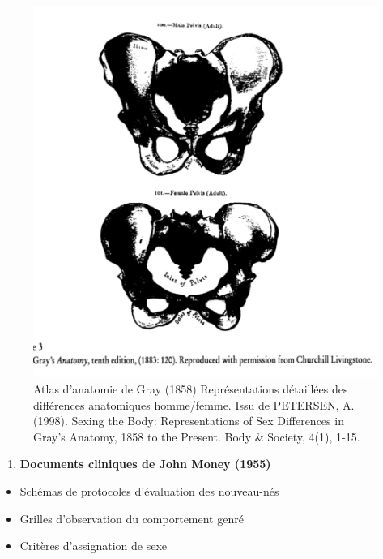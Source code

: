 \documentclass[
  letterpaper,
  DIV=11,
  numbers=noendperiod]{scrreprt}
\providecommand{\tightlist}{%
  \setlength{\itemsep}{0pt}\setlength{\parskip}{0pt}}\usepackage{longtable,booktabs,array}
\begin{document}
\begin{figure}[H]

{\centering \includegraphics{images/clipboard-1285558360.png}

}

\caption{Atlas d'anatomie de Gray (1858) Représentations détaillées des
différences anatomiques homme/femme. Issu de PETERSEN, A. (1998). Sexing
the Body: Representations of Sex Differences in Gray's Anatomy, 1858 to
the Present. Body \& Society, 4(1), 1-15.}

\end{figure}%

\begin{enumerate}
\def\labelenumi{\arabic{enumi}.}
\setcounter{enumi}{2}
\tightlist
\item
  \textbf{Documents cliniques de John Money (1955)}
\end{enumerate}

\begin{itemize}
\tightlist
\item
  Schémas de protocoles d'évaluation des nouveau-nés
\item
  Grilles d'observation du comportement genré
\item
  Critères d'assignation de sexe
\end{itemize}
\end{document}
